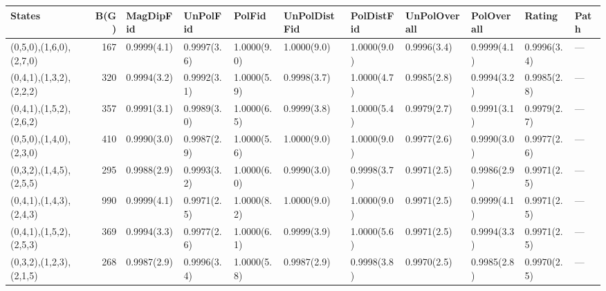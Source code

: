 \begin{tabular}{lrlllllllll}
\hline
 States                  &   B(G) & MagDipFid   & UnPolFid    & PolFid      & UnPolDistFid   & PolDistFid   & UnPolOverall   & PolOverall   & Rating      & Path   \\
\hline
 (0,5,0),(1,6,0),(2,7,0) &    167 & 0.9999(4.1) & 0.9997(3.6) & 1.0000(9.0) & 1.0000(9.0)    & 1.0000(9.0)  & 0.9996(3.4)    & 0.9999(4.1)  & 0.9996(3.4) & ---    \\
 (0,4,1),(1,3,2),(2,2,2) &    320 & 0.9994(3.2) & 0.9992(3.1) & 1.0000(5.9) & 0.9998(3.7)    & 1.0000(4.7)  & 0.9985(2.8)    & 0.9994(3.2)  & 0.9985(2.8) & ---    \\
 (0,4,1),(1,5,2),(2,6,2) &    357 & 0.9991(3.1) & 0.9989(3.0) & 1.0000(6.5) & 0.9999(3.8)    & 1.0000(5.4)  & 0.9979(2.7)    & 0.9991(3.1)  & 0.9979(2.7) & ---    \\
 (0,5,0),(1,4,0),(2,3,0) &    410 & 0.9990(3.0) & 0.9987(2.9) & 1.0000(5.6) & 1.0000(9.0)    & 1.0000(9.0)  & 0.9977(2.6)    & 0.9990(3.0)  & 0.9977(2.6) & ---    \\
 (0,3,2),(1,4,5),(2,5,5) &    295 & 0.9988(2.9) & 0.9993(3.2) & 1.0000(6.0) & 0.9990(3.0)    & 0.9998(3.7)  & 0.9971(2.5)    & 0.9986(2.9)  & 0.9971(2.5) & ---    \\
 (0,4,1),(1,4,3),(2,4,3) &    990 & 0.9999(4.1) & 0.9971(2.5) & 1.0000(8.2) & 1.0000(9.0)    & 1.0000(9.0)  & 0.9971(2.5)    & 0.9999(4.1)  & 0.9971(2.5) & ---    \\
 (0,4,1),(1,5,2),(2,5,3) &    369 & 0.9994(3.3) & 0.9977(2.6) & 1.0000(6.1) & 0.9999(3.9)    & 1.0000(5.6)  & 0.9971(2.5)    & 0.9994(3.3)  & 0.9971(2.5) & ---    \\
 (0,3,2),(1,2,3),(2,1,5) &    268 & 0.9987(2.9) & 0.9996(3.4) & 1.0000(5.8) & 0.9987(2.9)    & 0.9998(3.8)  & 0.9970(2.5)    & 0.9985(2.8)  & 0.9970(2.5) & ---    \\
\hline
\end{tabular}
